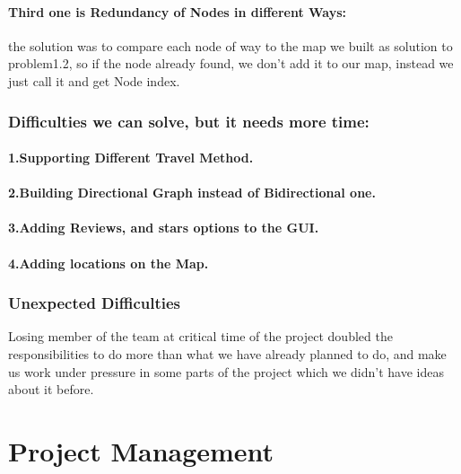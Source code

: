 \documentclass[a4paper, 12pt, english]{book}
\begin{document}
\subsubsection{Third one is Redundancy of Nodes in different Ways:} the solution was to compare each node of way to the map we built as solution to problem1.2, so if the node already found, we don’t add it to our map, instead we just call it and get Node index.
\subsection{Difficulties we can solve, but it needs more time:}
\subsubsection{1.Supporting Different Travel Method.}
\subsubsection{2.Building Directional Graph instead of Bidirectional one.}
\subsubsection{3.Adding Reviews, and stars options to the GUI.}
\subsubsection{4.Adding locations on the Map.}
\subsection{Unexpected Difficulties}
Losing member of the team at critical time of the project doubled the responsibilities to do more than what we have already planned to do, and make us work under pressure in some parts of the project which we didn't have ideas about it before.
\chapter{Project Management}
\end{document}
